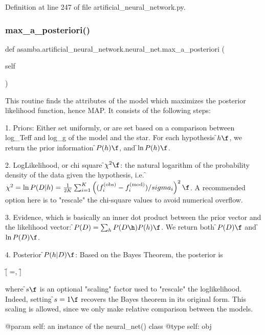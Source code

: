 Definition at line 247 of file artificial\+\_\+neural\+\_\+network.\+py.

\mbox{\label{classasamba_1_1artificial__neural__network_1_1neural__net_a333856c597f409a2ef20e07545baadf1}} 
\subsubsection{\texorpdfstring{max\+\_\+a\+\_\+posteriori()}{max\_a\_posteriori()}}
{\footnotesize\ttfamily def asamba.\+artificial\+\_\+neural\+\_\+network.\+neural\+\_\+net.\+max\+\_\+a\+\_\+posteriori (\begin{DoxyParamCaption}\item[{}]{self }\end{DoxyParamCaption})}

\begin{DoxyVerb}This routine finds the attributes of the model which maximizes the posterior likelihood function, hence MAP. 
It consists of the following steps:

1. Priors: Either set uniformly, or are set based on a comparison between log_Teff and log_g of the model and
   the star. For each hypothesis \f$h\f$, we return the prior information \f$P(h)\f$, and \f$\ln P(h)\f$.

2. LogLikelihood, or chi square \f$\chi^2\f$: the natural logarithm of the probability density of the data 
   given the hypothesis, i.e. 
   \f$\chi^2=\ln P(D|h) = \frac{1}{2K}\sum_{i=1}^{K} \left((f_i^{\rm (obs)} - f_i^{\rm (mod)})/sigma_i \right)^2 \f$.
   A recommended option here is to "rescale" the chi-square values to avoid numerical overflow.

3. Evidence, which is basically an inner dot product between the prior vector and the likelihood vector:
   \f$P(D)=\sum_h P(D\h) P(h) \f$. We return both \f$P(D)\f$ and \f$\ln P(D)\f$.

4. Posterior \f$P(h|D)\f$: Based on the Bayes Theorem, the posterior is 

   \f[
   =,
   \f]

   where \f$s\f$ is an optional "scaling" factor used to "rescale" the loglikelihood. Indeed, setting \f$s=1\f$
   recovers the Bayes theorem in its original form. This scaling is allowed, since we only make relative 
   comparison between the models.

@param self: an instance of the neural_net() class    
@type self: obj
\end{DoxyVerb}
 

